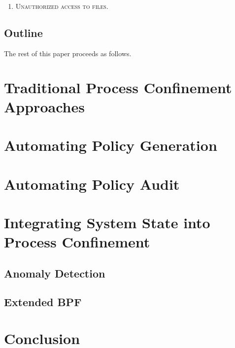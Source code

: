 \documentclass[dvipsnames, 12pt]{article}
\begin{document}
\begin{enumerate}[label=\bfseries A\arabic*.]
    \item \textsc{Unauthorized access to files.}
\end{enumerate}

\subsection{Outline}

The rest of this paper proceeds as follows. 

\section{Traditional Process Confinement Approaches}

\section{Automating Policy Generation}

\section{Automating Policy Audit}

\section{Integrating System State into Process Confinement}

\subsection{Anomaly Detection}

\subsection{Extended BPF}

\section{Conclusion}


\nocite{*} %
\clearpage
\printbibliography
\end{document}
